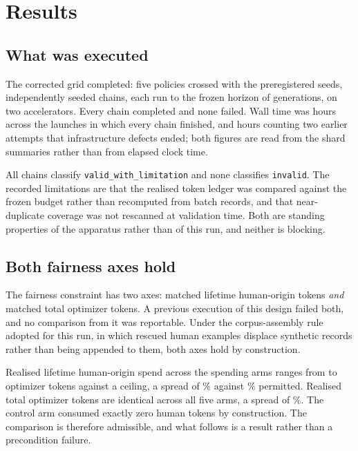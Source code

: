 \section{Results}
\label{sec:results}

\subsection{What was executed}

The corrected grid completed: five policies crossed with the \PilotSeeds{} preregistered
seeds, \PilotChains{} independently seeded chains, each run to the frozen horizon of
\PilotHorizon{} generations, on two accelerators. Every chain completed and none failed.
Wall time was \PilotWallHoursClean{} hours across the launches in which every chain
finished, and \PilotWallHoursIncludingFailed{} hours counting two earlier attempts that
infrastructure defects ended; both figures are read from the shard summaries rather than
from elapsed clock time.

All \PilotChains{} chains classify \texttt{valid\_with\_limitation} and none classifies
\texttt{invalid}. The recorded limitations are that the realised token ledger was compared
against the frozen budget rather than recomputed from batch records, and that
near-duplicate coverage was not rescanned at validation time. Both are standing properties
of the apparatus rather than of this run, and neither is blocking.

\subsection{Both fairness axes hold}

The fairness constraint has two axes: matched lifetime human-origin tokens \emph{and}
matched total optimizer tokens. A previous execution of this design failed both, and no
comparison from it was reportable. Under the corpus-assembly rule adopted for this run, in
which rescued human examples displace synthetic records rather than being appended to
them, both axes hold by construction.

Realised lifetime human-origin spend across the spending arms ranges from
\PilotMatchedLow{} to \PilotMatchedHigh{} optimizer tokens against a \PilotCeiling{}
ceiling, a spread of \PilotHumanSpreadPct\% against \PilotSpreadPermittedPct\% permitted.
Realised total optimizer tokens are identical across all five arms, a spread of
\PilotTotalSpreadExactPct\%. The control arm consumed exactly zero human tokens by
construction. The comparison is therefore admissible, and what follows is a result rather
than a precondition failure.

